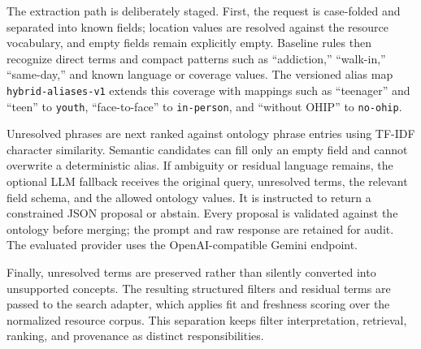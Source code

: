 \documentclass[12pt,oneside]{report}
\begin{document}
The extraction path is deliberately staged. First, the request is case-folded and separated into known fields; location values are resolved against the resource vocabulary, and empty fields remain explicitly empty. Baseline rules then recognize direct terms and compact patterns such as ``addiction,'' ``walk-in,'' ``same-day,'' and known language or coverage values. The versioned alias map \texttt{hybrid-aliases-v1} extends this coverage with mappings such as ``teenager'' and ``teen'' to \texttt{youth}, ``face-to-face'' to \texttt{in-person}, and ``without OHIP'' to \texttt{no-ohip}.

Unresolved phrases are next ranked against ontology phrase entries using TF-IDF character similarity. Semantic candidates can fill only an empty field and cannot overwrite a deterministic alias. If ambiguity or residual language remains, the optional LLM fallback receives the original query, unresolved terms, the relevant field schema, and the allowed ontology values. It is instructed to return a constrained JSON proposal or abstain. Every proposal is validated against the ontology before merging; the prompt and raw response are retained for audit. The evaluated provider uses the OpenAI-compatible Gemini endpoint.

Finally, unresolved terms are preserved rather than silently converted into unsupported concepts. The resulting structured filters and residual terms are passed to the search adapter, which applies fit and freshness scoring over the normalized resource corpus. This separation keeps filter interpretation, retrieval, ranking, and provenance as distinct responsibilities.
\end{document}
